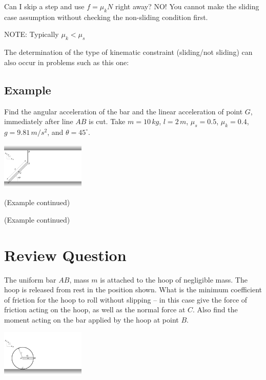 \documentclass[12pt,letterpaper,twoside]{report}
\begin{document}
Can I skip a step and use $f = \mu_k N$ right away?  NO!  You cannot make the sliding case assumption without checking the non-sliding condition first.

NOTE:  Typically $ \mu_k < \mu_s$

The determination of the type of kinematic constraint (sliding/not sliding) can also occur in problems such as this one:  

\subsection{Example}
Find the angular acceleration of the bar and the linear acceleration of point $G$, immediately after line $AB$ is cut.  Take $m = 10 \, kg$, $l=2 \, m$, $\mu_s=0.5$, $\mu_k=0.4$, $g=9.81 \, m/s^2$, and $\theta = 45^{\circ}$.  

\includegraphics[trim={0cm 1cm 22cm 1cm},clip,width=0.3\textwidth, left]{Slide59} 

\newpage

(Example continued)

\newpage

(Example continued)

\newpage

\section{Review Question}
The uniform bar $AB$, mass $m$ is attached to the hoop of negligible mass.  The hoop is released from rest in the position shown.  What is the minimum coefficient of friction for the hoop to roll without slipping – in this case give the force of friction acting on the hoop, as well as the normal force at $C$.  Also find the moment acting on the bar applied by the hoop at point $B$.

\includegraphics[trim={0cm 1cm 20cm 2cm},clip,width=0.3\textwidth, left]{Slide60} 


\newpage
\end{document}
